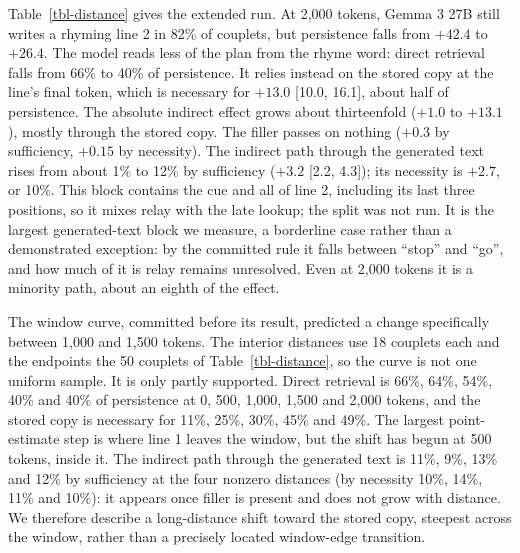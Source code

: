 \documentclass[
]{article}
\begin{document}
Table~\ref{tbl-distance} gives the extended run. At 2,000 tokens, Gemma
3 27B still writes a rhyming line 2 in 82\% of couplets, but persistence
falls from \(+42.4\) to \(+26.4\). The model reads less of the plan from
the rhyme word: direct retrieval falls from 66\% to 40\% of persistence.
It relies instead on the stored copy at the line's final token, which is
necessary for \(+13.0\) {[}10.0, 16.1{]}, about half of persistence. The
absolute indirect effect grows about thirteenfold (\(+1.0\) to
\(+13.1\)), mostly through the stored copy. The filler passes on nothing
(\(+0.3\) by sufficiency, \(+0.15\) by necessity). The indirect path
through the generated text rises from about 1\% to 12\% by sufficiency
(\(+3.2\) {[}2.2, 4.3{]}); its necessity is \(+2.7\), or 10\%. This
block contains the cue and all of line 2, including its last three
positions, so it mixes relay with the late lookup; the split was not
run. It is the largest generated-text block we measure, a borderline
case rather than a demonstrated exception: by the committed rule it
falls between ``stop'' and ``go'', and how much of it is relay remains
unresolved. Even at 2,000 tokens it is a minority path, about an eighth
of the effect.

The window curve, committed before its result, predicted a change
specifically between 1,000 and 1,500 tokens. The interior distances use
18 couplets each and the endpoints the 50 couplets of
Table~\ref{tbl-distance}, so the curve is not one uniform sample. It is
only partly supported. Direct retrieval is 66\%, 64\%, 54\%, 40\% and
40\% of persistence at 0, 500, 1,000, 1,500 and 2,000 tokens, and the
stored copy is necessary for 11\%, 25\%, 30\%, 45\% and 49\%. The
largest point-estimate step is where line 1 leaves the window, but the
shift has begun at 500 tokens, inside it. The indirect path through the
generated text is 11\%, 9\%, 13\% and 12\% by sufficiency at the four
nonzero distances (by necessity 10\%, 14\%, 11\% and 10\%): it appears
once filler is present and does not grow with distance. We therefore
describe a long-distance shift toward the stored copy, steepest across
the window, rather than a precisely located window-edge transition.
\end{document}

